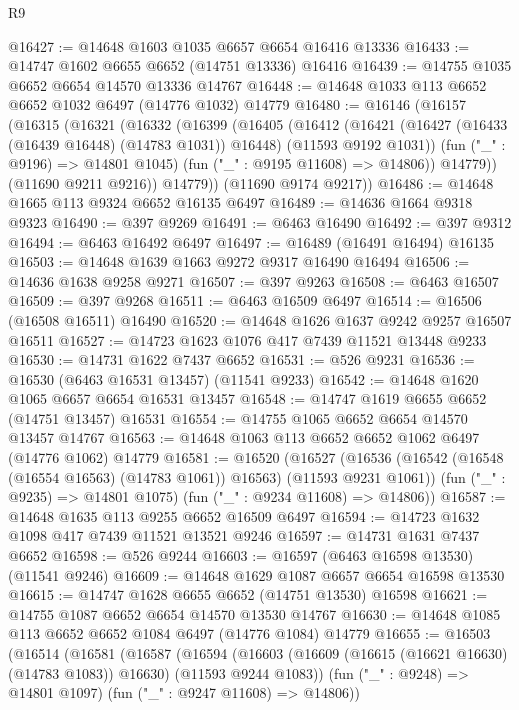 \begin{lexlean}{R9}
\begin{coremodule}
{{{{{{{{{{{{{{{{{{{{{{{{{{{{{{{{{{{{{{{{{{{{{{{{{{{{{{{{{{{{{{{{{{{{{{{{{{{{{{{{{{{{@16427 := @14648 @1603 @1035 @6657 @6654 @16416 @13336
@16433 := @14747 @1602 @6655 @6652 (@14751 @13336) @16416
@16439 := @14755 @1035 @6652 @6654 @14570 @13336 @14767
@16448 := @14648 @1033 @113 @6652 @6652 @1032 @6497 (@14776 @1032) @14779
@16480 := @16146
    (@16157
      (@16315
        (@16321
          (@16332
            (@16399
              (@16405
                (@16412
                  (@16421
                    (@16427 (@16433 (@16439 @16448) (@14783 @1031)) @16448)
                    (@11593 @9192 @1031))
                  (fun ("_" : @9196) => @14801 @1045)
                  (fun ("_" : @9195 @11608) => @14806))
                @14779))
            (@11690 @9211 @9216))
          @14779))
      (@11690 @9174 @9217))
@16486 := @14648 @1665 @113 @9324 @6652 @16135 @6497
@16489 := @14636 @1664 @9318 @9323
@16490 := @397 @9269
@16491 := @6463 @16490
@16492 := @397 @9312
@16494 := @6463 @16492 @6497
@16497 := @16489 (@16491 @16494) @16135
@16503 := @14648 @1639 @1663 @9272 @9317 @16490 @16494
@16506 := @14636 @1638 @9258 @9271
@16507 := @397 @9263
@16508 := @6463 @16507
@16509 := @397 @9268
@16511 := @6463 @16509 @6497
@16514 := @16506 (@16508 @16511) @16490
@16520 := @14648 @1626 @1637 @9242 @9257 @16507 @16511
@16527 := @14723 @1623 @1076 @417 @7439 @11521 @13448 @9233
@16530 := @14731 @1622 @7437 @6652
@16531 := @526 @9231
@16536 := @16530 (@6463 @16531 @13457) (@11541 @9233)
@16542 := @14648 @1620 @1065 @6657 @6654 @16531 @13457
@16548 := @14747 @1619 @6655 @6652 (@14751 @13457) @16531
@16554 := @14755 @1065 @6652 @6654 @14570 @13457 @14767
@16563 := @14648 @1063 @113 @6652 @6652 @1062 @6497 (@14776 @1062) @14779
@16581 := @16520
    (@16527
      (@16536 (@16542 (@16548 (@16554 @16563) (@14783 @1061)) @16563) (@11593 @9231 @1061))
      (fun ("_" : @9235) => @14801 @1075)
      (fun ("_" : @9234 @11608) => @14806))
@16587 := @14648 @1635 @113 @9255 @6652 @16509 @6497
@16594 := @14723 @1632 @1098 @417 @7439 @11521 @13521 @9246
@16597 := @14731 @1631 @7437 @6652
@16598 := @526 @9244
@16603 := @16597 (@6463 @16598 @13530) (@11541 @9246)
@16609 := @14648 @1629 @1087 @6657 @6654 @16598 @13530
@16615 := @14747 @1628 @6655 @6652 (@14751 @13530) @16598
@16621 := @14755 @1087 @6652 @6654 @14570 @13530 @14767
@16630 := @14648 @1085 @113 @6652 @6652 @1084 @6497 (@14776 @1084) @14779
@16655 := @16503
    (@16514
      (@16581
        (@16587
          (@16594
            (@16603 (@16609 (@16615 (@16621 @16630) (@14783 @1083)) @16630) (@11593 @9244 @1083))
            (fun ("_" : @9248) => @14801 @1097)
            (fun ("_" : @9247 @11608) => @14806))
}}}}}}}}}}}}}}}}}}}}}}}}}}}}}}}}}}}}}}}}}}}}}}}}}}}}}}}}}}}}}}}}}}}}}}}}}}}}}}}}}}}}
\end{coremodule}
\end{lexlean}
